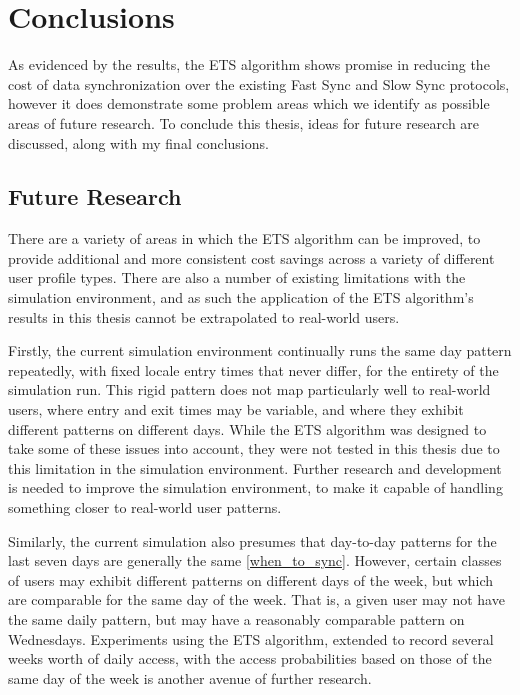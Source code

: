 \chapter{Conclusions}\label{Conc}

As evidenced by the results, the ETS algorithm shows promise in reducing the cost of data synchronization over the existing Fast Sync and Slow Sync protocols, however it does demonstrate some problem areas which we identify as possible areas of future research.  To conclude this thesis, ideas for future research are discussed, along with my final conclusions.

\section{Future Research}\label{future_research}

There are a variety of areas in which the ETS algorithm can be improved, to provide additional and more consistent cost savings across a variety of different user profile types.  There are also a number of existing limitations with the simulation environment, and as such the application of the ETS algorithm's results in this thesis cannot be extrapolated to real-world users.

Firstly, the current simulation environment continually runs the same day pattern repeatedly, with fixed locale entry times that never differ, for the entirety of the simulation run.  This rigid pattern does not map particularly well to real-world users, where entry and exit times may be variable, and where they exhibit different patterns on different days.  While the ETS algorithm was designed to take some of these issues into account, they were not tested in this thesis due to this limitation in the simulation environment.  Further research and development is needed to improve the simulation environment, to make it capable of handling something closer to real-world user patterns.

Similarly, the current simulation also presumes that day-to-day patterns for the last seven days are generally the same \ref{when_to_sync}.  However, certain classes of users may exhibit different patterns on different days of the week, but which are comparable for the same day of the week.  That is, a given user may not have the same daily pattern, but may have a reasonably comparable pattern on Wednesdays.  Experiments using the ETS algorithm, extended to record several weeks worth of daily access, with the access probabilities based on those of the same day of the week is another avenue of further research.

